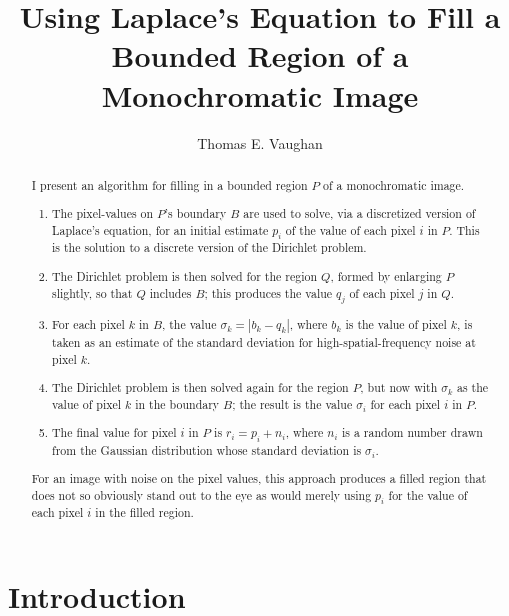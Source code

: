 \documentclass{article}
\title{%
Using Laplace's Equation to Fill a Bounded Region of a Monochromatic Image%
}
\author{Thomas E. Vaughan}
\begin{document}
\maketitle

\begin{abstract}

   I present an algorithm for filling in a bounded region $P$ of a
   monochromatic image.
   \begin{enumerate}
      \item The pixel-values on $P$'s boundary $B$ are used to solve, via a
         discretized version of Laplace's equation, for an initial estimate
         $p_i$ of the value of each pixel $i$ in $P$.  This is the solution to
         a discrete version of the Dirichlet problem.
      \item The Dirichlet problem is then solved for the region $Q$, formed by
         enlarging $P$ slightly, so that $Q$ includes $B$; this produces the
         value $q_j$ of each pixel $j$ in $Q$.
      \item For each pixel $k$ in $B$, the value $\sigma_k = |b_k - q_k|$,
         where $b_k$ is the value of pixel $k$, is taken as an estimate of the
         standard deviation for high-spatial-frequency noise at pixel $k$.
      \item The Dirichlet problem is then solved again for the region $P$, but
         now with $\sigma_k$ as the value of pixel $k$ in the boundary $B$; the
         result is the value $\sigma_i$ for each pixel $i$ in $P$.
      \item The final value for pixel $i$ in $P$ is $r_i = p_i + n_i$, where
         $n_i$ is a random number drawn from the Gaussian distribution whose
         standard deviation is $\sigma_i$.
   \end{enumerate}
   For an image with noise on the pixel values, this approach produces a filled
   region that does not so obviously stand out to the eye as would merely using
   $p_i$ for the value of each pixel $i$ in the filled region.

\end{abstract}

\section{Introduction}
\end{document}
